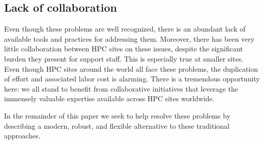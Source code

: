 \subsection{Lack of collaboration}
\label{sec:traditional_lack}

Even though these problems are well recognized, there is an abundant lack
of available tools and practices for addressing them.
Moreover, there has been very little collaboration between HPC sites on these
issues, despite the significant burden they present for support staff. This is especially true at smaller sites. Even though HPC sites around the world all face these problems, the duplication of effort and associated labor cost is alarming. There is a tremendous opportunity
here: we all stand to benefit from collaborative initiatives that
leverage the
immensely valuable expertise available across HPC sites worldwide.

In the remainder of this paper we seek to help resolve these problems
by describing a modern, robust, and flexible alternative to these
traditional approaches.


